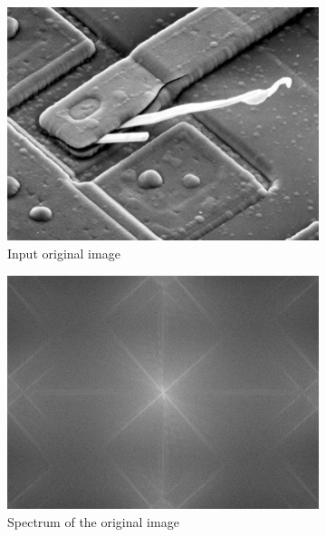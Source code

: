 \documentclass[UTF8]{ctexart}
\begin{document}
\begin{figure}[htbp]
    \centering
    \begin{subfigure}{0.3\textwidth}
        \centering
        \includegraphics[width=\linewidth]{blown_ic.png}
        \caption{Input original image}
    \end{subfigure}%
    \hfill
    \begin{subfigure}{0.3\textwidth}
        \centering
        \includegraphics[width=\linewidth]{ic_spectrum.png}
        \caption{Spectrum of the original image}
    \end{subfigure}%
    \hfill
    \begin{subfigure}{0.3\textwidth}
        \centering

\end{subfigure}
\end{figure}
\end{document}
